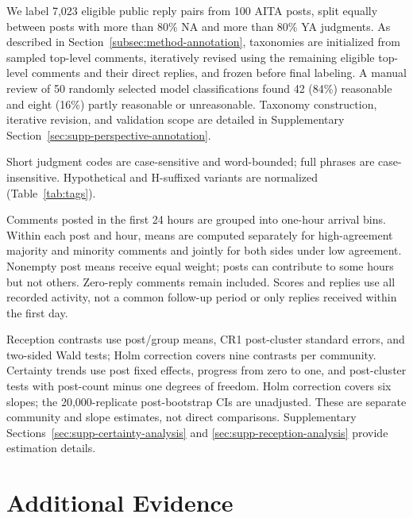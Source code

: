 \label{subsec:appendix-moral-annotation}
We label 7,023 eligible public reply pairs from 100 AITA posts, split equally between posts with more than 80\% NA and more than 80\% YA judgments.
As described in Section~\ref{subsec:method-annotation}, taxonomies are initialized from sampled top-level comments, iteratively revised using the remaining eligible top-level comments and their direct replies,
and frozen before final labeling.
A manual review of 50 randomly selected model classifications found 42 (84\%) reasonable and eight (16\%) partly reasonable or unreasonable.
Taxonomy construction, iterative revision, and validation scope are detailed in Supplementary Section~\ref{sec:supp-perspective-annotation}.

\label{sec:appendix-tags}
Short judgment codes are case-sensitive and word-bounded; full phrases
are case-insensitive. Hypothetical and H-suffixed variants are normalized
(Table~\ref{tab:tags}).



\label{sec:appendix-aita-arrival}
Comments posted in the first 24 hours are grouped into one-hour arrival
bins. Within each post and hour, means are computed separately for
high-agreement majority and minority comments and jointly for both sides
under low agreement. Nonempty post means receive equal weight; posts
can contribute to some hours but not others. Zero-reply comments remain
included. Scores and replies use all recorded activity, not a common
follow-up period or only replies received within the first day.

Reception contrasts use post/group means, CR1 post-cluster standard
errors, and two-sided Wald tests; Holm correction covers nine contrasts
per community. Certainty trends use post fixed effects, progress from
zero to one, and post-cluster tests with post-count minus one degrees
of freedom. Holm correction covers six slopes; the 20,000-replicate
post-bootstrap CIs are unadjusted. These are separate community and
slope estimates, not direct comparisons. Supplementary
Sections~\ref{sec:supp-certainty-analysis} and
\ref{sec:supp-reception-analysis} provide estimation details.

\section{Additional Evidence}
\label{sec:appendix-evidence}

